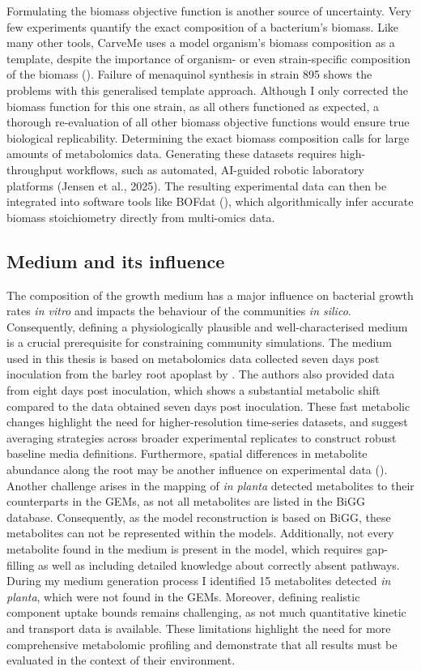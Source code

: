 Formulating the biomass objective function is another source of uncertainty. Very few experiments quantify the exact composition of a bacterium's biomass. Like many other tools, CarveMe uses a model organism’s biomass composition as a template, despite the importance of organism- or even strain-specific composition of the biomass (\cite{xavier_integration_2017}). Failure of menaquinol synthesis in strain 895 shows the problems with this generalised template approach. Although I only corrected the biomass function for this one strain, as all others functioned as expected, a thorough re-evaluation of all other biomass objective functions would ensure true biological replicability. Determining the exact biomass composition calls for large amounts of metabolomics data. Generating these datasets requires high-throughput workflows, such as automated, AI-guided robotic laboratory platforms (Jensen et al., 2025). The resulting experimental data can then be integrated into software tools like BOFdat (\cite{lachance_bofdat_2019}), which algorithmically infer accurate biomass stoichiometry directly from multi-omics data.
\subsection{Medium and its influence}
The composition of the growth medium has a major influence on bacterial growth rates \textit{in vitro} and impacts the behaviour of the communities \textit{in silico}. Consequently, defining a physiologically plausible and well-characterised medium is a crucial prerequisite for constraining community simulations. The medium used in this thesis is based on metabolomics data collected seven days post inoculation from the barley root apoplast by \cite{saake_ergosterol-induced_2025}. The authors also provided data from eight days post inoculation, which shows a substantial metabolic shift compared to the data obtained seven days post inoculation. These fast metabolic changes highlight the need for higher-resolution time-series datasets, and suggest averaging strategies across broader experimental replicates to construct robust baseline media definitions. Furthermore, spatial differences in metabolite abundance along the root may be another influence on experimental data (\cite{loo_sugar_2024}). Another challenge arises in the mapping of \textit{in planta }detected metabolites to their counterparts in the GEMs, as not all metabolites are listed in the BiGG database. Consequently, as the model reconstruction is based on BiGG, these metabolites can not be represented within the models. Additionally, not every metabolite found in the medium is present in the model, which requires gap-filling as well as including detailed knowledge about correctly absent pathways. During my medium generation process I identified 15 metabolites detected \textit{in planta}, which were not found in the GEMs. Moreover, defining realistic component uptake bounds remains challenging, as not much quantitative kinetic and transport data is available. These limitations highlight the need for more comprehensive metabolomic profiling and demonstrate that all results must be evaluated in the context of their environment.

